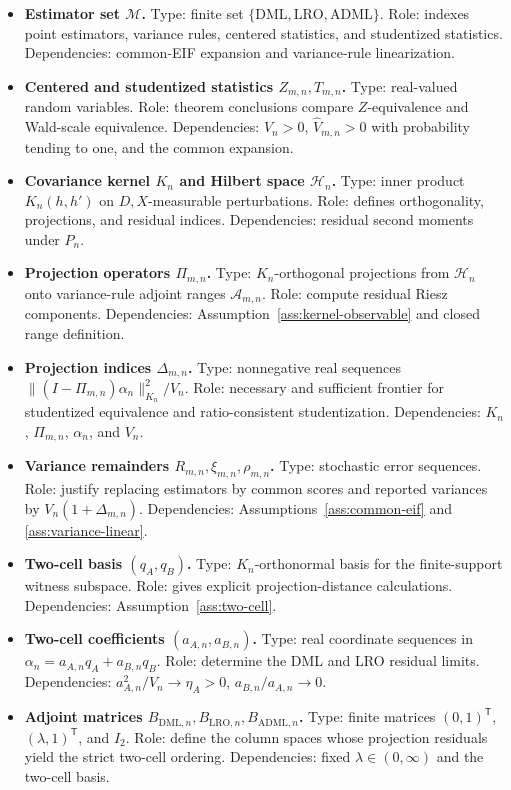 \documentclass[11pt]{article}
\newcommand{\transpose}{\mathsf{T}}
\theoremstyle{definition}
\theoremstyle{plain}
\theoremstyle{remark}
\begin{document}
\begin{itemize}[leftmargin=*]
  \item \textbf{Estimator set \(\mathcal M\).}  Type: finite set \(\{\mathrm{DML},\mathrm{LRO},\mathrm{ADML}\}\).  Role: indexes point estimators, variance rules, centered statistics, and studentized statistics.  Dependencies: common-EIF expansion and variance-rule linearization.
  \item \textbf{Centered and studentized statistics \(Z_{m,n},T_{m,n}\).}  Type: real-valued random variables.  Role: theorem conclusions compare \(Z\)-equivalence and Wald-scale equivalence.  Dependencies: \(V_n>0\), \(\hat V_{m,n}>0\) with probability tending to one, and the common expansion.
  \item \textbf{Covariance kernel \(K_n\) and Hilbert space \(\mathcal H_n\).}  Type: inner product \(K_n(h,h')\) on \(D,X\)-measurable perturbations.  Role: defines orthogonality, projections, and residual indices.  Dependencies: residual second moments under \(P_n\).
  \item \textbf{Projection operators \(\Pi_{m,n}\).}  Type: \(K_n\)-orthogonal projections from \(\mathcal H_n\) onto variance-rule adjoint ranges \(\mathcal A_{m,n}\).  Role: compute residual Riesz components.  Dependencies: Assumption~\ref{ass:kernel-observable} and closed range definition.
  \item \textbf{Projection indices \(\Delta_{m,n}\).}  Type: nonnegative real sequences \(\|(I-\Pi_{m,n})\alpha_n\|_{K_n}^2/V_n\).  Role: necessary and sufficient frontier for studentized equivalence and ratio-consistent studentization.  Dependencies: \(K_n\), \(\Pi_{m,n}\), \(\alpha_n\), and \(V_n\).
  \item \textbf{Variance remainders \(R_{m,n},\xi_{m,n},\rho_{m,n}\).}  Type: stochastic error sequences.  Role: justify replacing estimators by common scores and reported variances by \(V_n(1+\Delta_{m,n})\).  Dependencies: Assumptions~\ref{ass:common-eif} and \ref{ass:variance-linear}.
  \item \textbf{Two-cell basis \((q_A,q_B)\).}  Type: \(K_n\)-orthonormal basis for the finite-support witness subspace.  Role: gives explicit projection-distance calculations.  Dependencies: Assumption~\ref{ass:two-cell}.
  \item \textbf{Two-cell coefficients \((a_{A,n},a_{B,n})\).}  Type: real coordinate sequences in \(\alpha_n=a_{A,n}q_A+a_{B,n}q_B\).  Role: determine the DML and LRO residual limits.  Dependencies: \(a_{A,n}^2/V_n\to\eta_A>0\), \(a_{B,n}/a_{A,n}\to0\).
  \item \textbf{Adjoint matrices \(B_{\mathrm{DML},n},B_{\mathrm{LRO},n},B_{\mathrm{ADML},n}\).}  Type: finite matrices \((0,1)^\transpose\), \((\lambda,1)^\transpose\), and \(I_2\).  Role: define the column spaces whose projection residuals yield the strict two-cell ordering.  Dependencies: fixed \(\lambda\in(0,\infty)\) and the two-cell basis.

\end{itemize}
\end{document}

